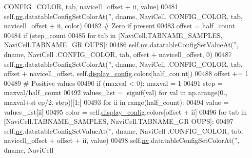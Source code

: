 \begin{DoxyCode}
      CONFIG\_COLOR, tab, navicell\_offset + ii, value)
00481                            self.\hyperlink{classnavicom_1_1navicom_1_1NaviCom_af740fe52f9f3cfc076ae88ca696bd05e}{nv}.datatableConfigSetColorAt(\textcolor{stringliteral}{''}, dname, NaviCell.
      CONFIG\_COLOR, tab, navicell\_offset + ii, color)
00482                     \textcolor{comment}{# Zero if present}
00483                     offset = half\_count
00484                     \textcolor{keywordflow}{if} (step\_count%
00485                         \textcolor{keywordflow}{for} tab \textcolor{keywordflow}{in} [NaviCell.TABNAME\_SAMPLES, NaviCell.TABNAME\_GR
      OUPS]:
00486                             self.\hyperlink{classnavicom_1_1navicom_1_1NaviCom_af740fe52f9f3cfc076ae88ca696bd05e}{nv}.datatableConfigSetValueAt(\textcolor{stringliteral}{''}, dname, NaviCell
      .CONFIG\_COLOR, tab, offset + navicell\_offset, 0)
00487                             self.\hyperlink{classnavicom_1_1navicom_1_1NaviCom_af740fe52f9f3cfc076ae88ca696bd05e}{nv}.datatableConfigSetColorAt(\textcolor{stringliteral}{''}, dname, NaviCell
      .CONFIG\_COLOR, tab, offset + navicell\_offset, self.\hyperlink{classnavicom_1_1navicom_1_1NaviCom_a56628d774db59cb8b06af3801fb6306c}{display_config}.colors[half\_cou
      nt])
00488                         offset += 1
00489                     \textcolor{comment}{# Positive values}
00490                     \textcolor{keywordflow}{if} (maxval < 0): maxval = 1
00491                     step = maxval/half\_count
00492                     values\_list = [signif(val) \textcolor{keywordflow}{for} val \textcolor{keywordflow}{in} np.arange(0., maxval+st
      ep/2, step)][1:]
00493                     \textcolor{keywordflow}{for} ii \textcolor{keywordflow}{in} range(half\_count):
00494                         value = values\_list[ii]
00495                         color = self.\hyperlink{classnavicom_1_1navicom_1_1NaviCom_a56628d774db59cb8b06af3801fb6306c}{display_config}.colors[offset + ii]
00496                         \textcolor{keywordflow}{for} tab \textcolor{keywordflow}{in} [NaviCell.TABNAME\_SAMPLES, NaviCell.TABNAME\_GR
      OUPS]:
00497                             self.\hyperlink{classnavicom_1_1navicom_1_1NaviCom_af740fe52f9f3cfc076ae88ca696bd05e}{nv}.datatableConfigSetValueAt(\textcolor{stringliteral}{''}, dname, NaviCell
      .CONFIG\_COLOR, tab, navicell\_offset + offset + ii, value)
00498                             self.\hyperlink{classnavicom_1_1navicom_1_1NaviCom_af740fe52f9f3cfc076ae88ca696bd05e}{nv}.datatableConfigSetColorAt(\textcolor{stringliteral}{''}, dname, NaviCell

\end{DoxyCode}
